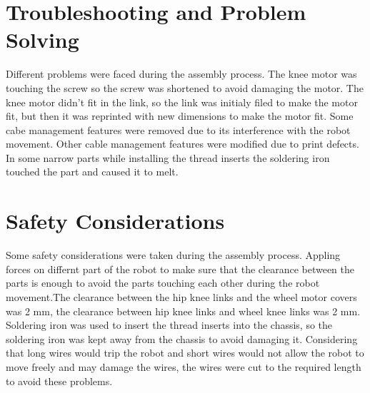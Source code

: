 \section{Troubleshooting and Problem Solving}
Different problems were faced during the assembly process.
The knee motor was touching the screw so the screw was shortened to avoid damaging the motor.
The knee motor didn't fit in the link, so the link was initialy filed to make the motor fit, but then it was reprinted with new dimensions to make the motor fit.
Some cabe management features were removed due to its interference with the robot movement.
Other cable management features were modified due to print defects. In some narrow parts while installing the thread inserts the soldering iron touched the part and caused it to melt.

\section{Safety Considerations}

Some safety considerations were taken during the assembly process.
Appling forces on differnt part of the robot to make sure that the clearance between the parts is enough to avoid the parts touching each other during the robot movement.The clearance between the hip knee links and the wheel motor covers was 2 mm, the clearance between hip knee links and wheel knee links was 2 mm.
Soldering iron was used to insert the thread inserts into the chassis, so the soldering iron was kept away from the chassis to avoid damaging it. Considering that long wires would trip the robot and short wires would not allow the robot to move freely and may damage the wires, the wires were cut to the required length to avoid these problems.

